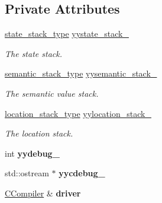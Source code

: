 \subsection*{Private Attributes}
\begin{DoxyCompactItemize}
\item 
\hypertarget{classyy_1_1CParser_aa9a426113e94e2a9823f3972ebb4cfef}{\hyperlink{classyy_1_1CParser_aba46c1145be36b531f0765b49ae812e8}{state\-\_\-stack\-\_\-type} \hyperlink{classyy_1_1CParser_aa9a426113e94e2a9823f3972ebb4cfef}{yystate\-\_\-stack\-\_\-}}\label{classyy_1_1CParser_aa9a426113e94e2a9823f3972ebb4cfef}

\begin{DoxyCompactList}\small\item\em The state stack. \end{DoxyCompactList}\item 
\hypertarget{classyy_1_1CParser_a0db22d353f7bd47d83133a35dca7624a}{\hyperlink{classyy_1_1CParser_af0ed7ecea92b2c850e0d79973ea2e6a6}{semantic\-\_\-stack\-\_\-type} \hyperlink{classyy_1_1CParser_a0db22d353f7bd47d83133a35dca7624a}{yysemantic\-\_\-stack\-\_\-}}\label{classyy_1_1CParser_a0db22d353f7bd47d83133a35dca7624a}

\begin{DoxyCompactList}\small\item\em The semantic value stack. \end{DoxyCompactList}\item 
\hypertarget{classyy_1_1CParser_aa3271bf5b8849f7b296371b24543a788}{\hyperlink{classyy_1_1CParser_af7f925a684c7810b103c4339bb6be028}{location\-\_\-stack\-\_\-type} \hyperlink{classyy_1_1CParser_aa3271bf5b8849f7b296371b24543a788}{yylocation\-\_\-stack\-\_\-}}\label{classyy_1_1CParser_aa3271bf5b8849f7b296371b24543a788}

\begin{DoxyCompactList}\small\item\em The location stack. \end{DoxyCompactList}\item 
\hypertarget{classyy_1_1CParser_a2d82242a3598ee24832a113318f1875d}{int {\bfseries yydebug\-\_\-}}\label{classyy_1_1CParser_a2d82242a3598ee24832a113318f1875d}

\item 
\hypertarget{classyy_1_1CParser_a287e671f23a5e8f002bbdd16770d3004}{std\-::ostream $\ast$ {\bfseries yycdebug\-\_\-}}\label{classyy_1_1CParser_a287e671f23a5e8f002bbdd16770d3004}

\item 
\hypertarget{classyy_1_1CParser_abb279fb41595cebda9030253bb8adf4b}{\hyperlink{classCCompiler}{C\-Compiler} \& {\bfseries driver}}\label{classyy_1_1CParser_abb279fb41595cebda9030253bb8adf4b}

\end{DoxyCompactItemize}
